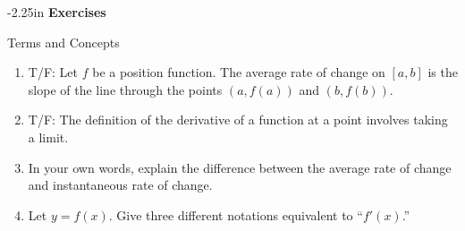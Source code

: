 \begin{adjustwidth*}{}{-2.25in}
\textbf{{\large Exercises}}
\setlength{\columnsep}{25pt}
\begin{multicols*}{2}
\noindent Terms and Concepts \small
\begin{enumerate}[1)]
\item {T/F: Let $f$ be a position function. The average rate of change on $[a,b]$ is the slope of the line through the points $(a, f(a))$ and $(b,f(b))$.}
\item {T/F: The definition of the derivative of a function at a point involves taking a limit.}
\item {In your own words, explain the difference between the average rate of change and instantaneous rate of change.}
\item Let $y = f(x)$. Give three different notations equivalent to ``$f'(x)$.''
\end{enumerate} 

 \small



\end{multicols*}
\end{adjustwidth*}
